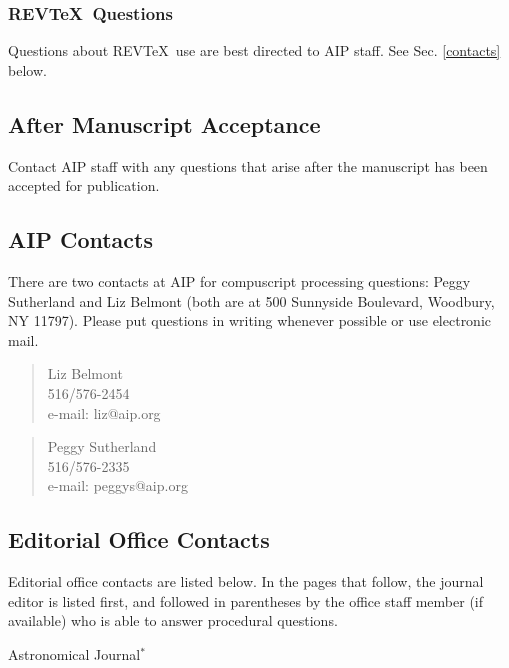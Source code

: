 \subsubsection{REV\TeX\ Questions}

Questions about REV\TeX\ use are best directed to AIP staff. See Sec.
\ref{contacts} below.

\subsection{After Manuscript Acceptance}

Contact AIP staff with any questions that arise after the manuscript has
been accepted for publication.
\subsection{AIP Contacts\label{contacts}}



There are two contacts at AIP for compuscript processing questions: Peggy
Sutherland and Liz Belmont (both are at 500 Sunnyside Boulevard, Woodbury,
NY 11797).  Please put questions in writing whenever possible or use
electronic mail.

\begin{verse}
Liz Belmont\\
516/576-2454\\
e-mail: liz@aip.org\\
\end{verse}
\vspace{1pc}

\begin{verse}
Peggy Sutherland\\
516/576-2335\\
e-mail: peggys@aip.org\\
\end{verse}

\subsection{Editorial Office Contacts}

Editorial office contacts are listed below. In the pages that follow, the
journal editor is listed first, and followed in parentheses by the office
staff member (if available) who is able to answer procedural questions.

\smallskip

\noindent      Astronomical Journal$^*$

